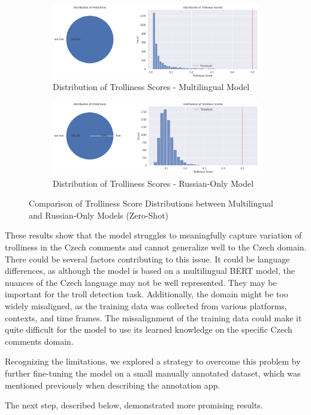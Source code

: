 \documentclass[twoside]{ctuthesis}
\theoremstyle{plain}
\theoremstyle{definition}
\theoremstyle{note}
\begin{document}
\begin{figure}[h]
    \centering
    \begin{subfigure}{0.49\textwidth}
        \includegraphics[width=\linewidth]{figures/distribution_multi.png}
        \caption{Distribution of Trolliness Scores - Multilingual Model}
        \label{fig:distribution_multi}
    \end{subfigure}
    \hfill
    \begin{subfigure}{0.49\textwidth}
        \includegraphics[width=\linewidth]{figures/russian_distribution.png}
        \caption{Distribution of Trolliness Scores - Russian-Only Model}
        \label{fig:russian_distribution}
    \end{subfigure}
    \caption{Comparison of Trolliness Score Distributions between Multilingual and Russian-Only Models (Zero-Shot)}
    \label{fig:distribution_comparison}
\end{figure}

These results show that the model struggles to meaningfully capture variation of trolliness in the Czech comments and cannot generalize well to the Czech domain. There could be several factors contributing to this issue. It could be language differences, as although the model is based on a multilingual BERT model, the nuances of the Czech language may not be well represented. They may be important for the troll detection task. Additionally, the domain might be too widely misaligned, as the training data was collected from various platforms, contexts, and time frames. The missalignment of the training data could make it quite difficult for the model to use its learned knowledge on the specific Czech comments domain.
\par 
Recognizing the limitations, we explored a strategy to overcome this problem by further fine-tuning the model on a small manually annotated dataset, which was mentioned previously when describing the annotation app.\par
The next step, described below, demonstrated more promising results.\par
\end{document}
